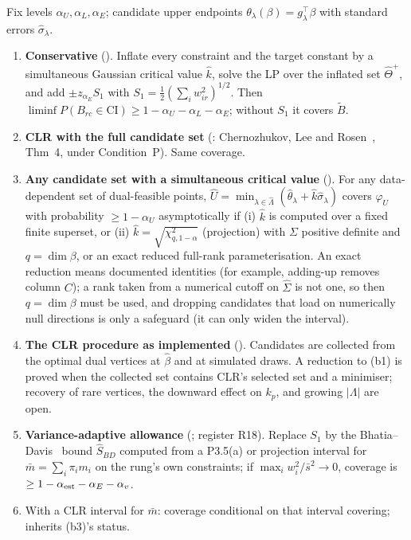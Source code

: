 \begin{result}\label{res:p35}
Fix levels $\alpha_U,\alpha_L,\alpha_E$; candidate upper endpoints
$\theta_\lambda(\beta)=g_\lambda^\top\beta$ with standard errors $\hat\sigma_\lambda$.
\begin{enumerate}[label=(\alph*),nosep]
\item \textbf{Conservative} (). Inflate every constraint and the target
constant by a simultaneous Gaussian critical value $\hat k$, solve the LP over the
inflated set $\hat\Theta^+$, and add $\pm z_{\alpha_E}S_1$ with
$S_1=\tfrac12(\sum_iw_{ir}^2)^{1/2}$. Then
$\liminf P(B_{rc}\in\mathrm{CI})\ge1-\alpha_U-\alpha_L-\alpha_E$; without $S_1$ it
covers $\tilde B$.
\item[(b1)] \textbf{CLR with the full candidate set} (: Chernozhukov, Lee
and Rosen~\citep{clr2013}, Thm~4, under Condition~P). Same coverage.
\item[(b2)] \textbf{Any candidate set with a simultaneous critical value}
(). For any data-dependent set of dual-feasible points,
$\hat U=\min_{\lambda\in\hat\Lambda}(\hat\theta_\lambda+\hat k\hat\sigma_\lambda)$
covers $\varphi_U$ with probability $\ge1-\alpha_U$ asymptotically if (i) $\hat k$ is
computed over a fixed finite superset, or (ii) $\hat k=\sqrt{\chi^2_{q,1-\alpha}}$
(projection) with $\Sigma$ positive definite and $q=\dim\beta$, or an exact reduced
full-rank parameterisation. An exact reduction means documented identities
(for example, adding-up removes column $C$); a rank taken from a numerical cutoff
on $\hat\Sigma$ is not one, so then $q=\dim\beta$ must be used, and dropping
candidates that load on numerically null directions is only a safeguard (it can
only widen the interval).
\item[(b3)] \textbf{The CLR procedure as implemented} (). Candidates are collected from the optimal dual vertices at
$\hat\beta$ and at simulated draws. A reduction to (b1) is proved when the
collected set contains CLR's selected set and a minimiser; recovery of rare
vertices, the downward effect on $k_p$, and growing $|\Lambda|$ are open.
\item[(c1)] \textbf{Variance-adaptive allowance} (; register R18).
Replace $S_1$ by the Bhatia--Davis~\citep{bhatiadavis2000} bound $\hat S_{BD}$ computed from a P3.5(a) or
projection interval for $\bar m=\sum_i\pi_im_i$ on the rung's own constraints;
if $\max_iw_i^2/\bar s^2\to0$, coverage is $\ge1-\alpha_{\rm est}-\alpha_E-\alpha_v$.
\item[(c2)] With a CLR interval for $\bar m$: coverage conditional on that interval
covering; inherits (b3)'s status.
\end{enumerate}
\end{result}
